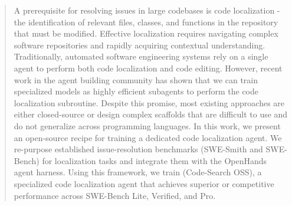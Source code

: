 \begin{abstract}
A prerequisite for resolving issues in large codebases is code localization - the identification of relevant files, classes, and functions in the repository that must be modified. Effective localization requires navigating complex software repositories and rapidly acquiring contextual understanding. Traditionally, automated software engineering systems rely on a single agent to perform both code localization and code editing. However, recent work in the agent building community has shown that we can train specialized models as highly efficient subagents to perform the code localization subroutine. Despite this promise, most existing approaches are either closed-source or design complex scaffolds that are difficult to use and do not generalize across programming languages. In this work, we present an open-source recipe for training a dedicated code localization agent. We re-purpose established issue-resolution benchmarks (SWE-Smith and SWE-Bench) for localization tasks and integrate them with the OpenHands agent harness. Using this framework, we train \texttt{\methodname} (Code-Search OSS), a specialized code localization agent that achieves superior or competitive performance across SWE-Bench Lite, Verified, and Pro.
\end{abstract}
